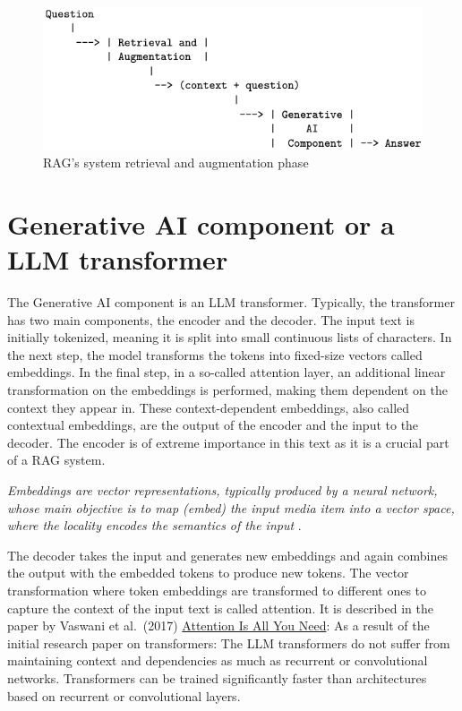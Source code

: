 \documentclass{wseas}
\begin{document}
\begin{figure}[htbp]
  \centering
  \includegraphics[width=\linewidth]{resources/v1/retrievalAndAugmentation.png}
  \caption{RAG's system retrieval and augmentation phase}
  \label{fig:rag_system_figure}
\end{figure}

\section{Generative AI component or a LLM transformer}

The Generative AI component is an LLM transformer. Typically, the
transformer has two main components, the encoder and the decoder. The
input text is initially tokenized, meaning it is split into small
continuous lists of characters. In the next step, the model transforms
the tokens into fixed-size vectors called embeddings. In the final step,
in a so-called attention layer, an additional linear transformation on
the embeddings is performed, making them dependent on the context they
appear in. These context-dependent embeddings, also called contextual
embeddings, are the output of the encoder and the input to the decoder.
The encoder is of extreme importance in this text as it is a crucial
part of a RAG system.

\emph{Embeddings are vector representations, typically produced by a
neural network, whose main objective is to map (embed) the input media
item into a vector space, where the locality encodes the semantics of
the input} \cite{cite2}.

The decoder takes the input and generates new embeddings and again
combines the output with the embedded tokens to produce new tokens. The
vector transformation where token embeddings are transformed to
different ones to capture the context of the input text is called
attention. It is described in the paper by Vaswani et al.~(2017)
\href{https://arxiv.org/pdf/1706.03762}{Attention Is All You Need}: As a
result of the initial research paper on transformers: The LLM
transformers do not suffer from maintaining context and dependencies as
much as recurrent or convolutional networks.
Transformers can be trained significantly faster than architectures
based on recurrent or convolutional layers.
\end{document}
